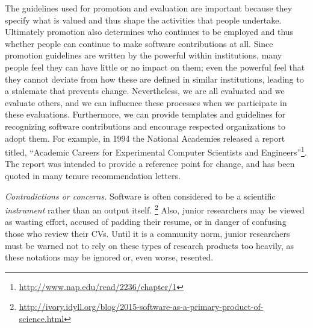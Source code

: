 \documentclass[a4paper,UKenglish]{dagman}
\begin{document}
The guidelines used for promotion and evaluation are important because they specify what is valued and thus shape the activities that people undertake. Ultimately promotion also determines who continues to be employed and thus whether people can continue to make software contributions at all. Since promotion guidelines are written by the powerful within institutions, many people feel they can have little or no impact on them; even the powerful feel that they cannot deviate from how these are defined in similar institutions, leading to a stalemate that prevents change.
Nevertheless, we are all evaluated and we evaluate others, and we can influence these processes when we participate in these evaluations.
Furthermore, we can provide templates and guidelines for recognizing software contributions and encourage respected organizations to adopt them.
For example, in 1994 the National Academies released a report titled, ``Academic Careers for Experimental Computer Scientists and Engineers''\footnote{\url{http://www.nap.edu/read/2236/chapter/1}}. The report was intended to provide a reference point for change, and has been quoted in many tenure recommendation letters.


\emph{Contradictions or concerns.}
Software is often considered to be a scientific \emph{instrument} rather than an output itself.%
\footnote{\url{http://ivory.idyll.org/blog/2015-software-as-a-primary-product-of-science.html}}
Also, junior researchers may be viewed as wasting effort, accused of padding their resume, or in danger of confusing those who review their CVs. Until it is a community norm, junior researchers must be warned not to rely on these types of research products too heavily, as these notations may be ignored or, even worse, resented.
\end{document}
